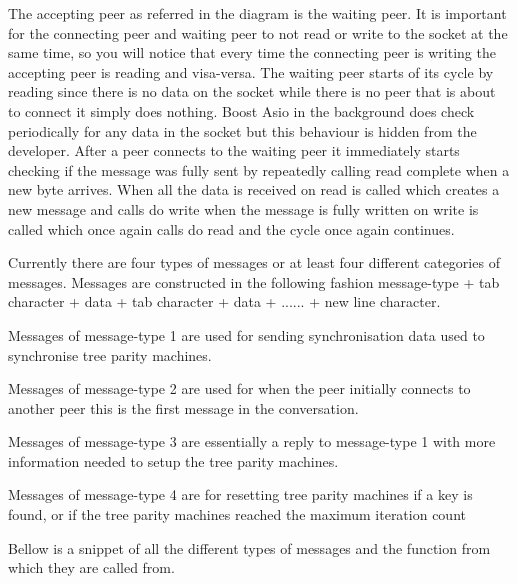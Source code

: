The accepting peer as referred in the diagram is the waiting peer. It is important for the connecting peer and waiting peer to not read or write to the socket at the same time, so you will notice that every time the connecting peer is writing the accepting peer is reading and visa-versa.  
The waiting peer starts of its cycle by reading since there is no data on the socket while there is no peer that is about to connect it simply does nothing. Boost Asio in the background does check periodically for any data in the socket but this behaviour is hidden from the developer. After a peer connects to the waiting peer it immediately starts checking if the message was fully sent by repeatedly calling read complete when a new byte arrives. When all the data is received on read is called which creates a new message and calls do write when the message is fully written on write is called which once again calls do read and the cycle once again continues.

Currently there are four types of messages or at least four different categories of messages. Messages are constructed in the following fashion message-type + tab character + data + tab character + data + ...... + new line character.

Messages of message-type 1 are used for sending synchronisation data used to synchronise tree parity machines.

Messages of message-type 2 are used for when the peer initially connects to another peer this is the first message in the conversation.

Messages of message-type 3 are essentially a reply to message-type 1 with more information needed to setup the tree parity machines.

Messages of message-type 4 are for resetting tree parity machines if a key is found, or if the tree parity machines reached the maximum iteration count

Bellow is a snippet of all the different types of messages and the function from which they are called from.

